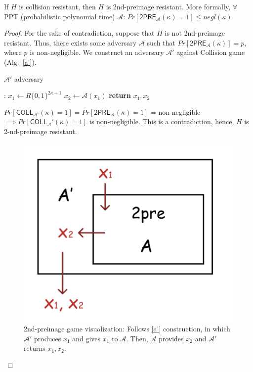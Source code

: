 \begin{theorem}
If $H$ is collision resistant, then $H$ is 2nd-preimage resistant. More formally, $\forall$ PPT (probabilistic polynomial time) $\mathcal{A}$: $Pr[\mathsf{2PRE}_{\mathcal{A}}(\kappa) = 1] \leq
negl(\kappa).$
\end{theorem}

\begin{proof}
For the sake of contradiction, suppose that $H$ is not 2nd-preimage resistant. Thus, there exists some adversary $\mathcal{A}$ such that $Pr[\mathsf{2PRE}_{\mathcal{A}}(\kappa)] = p$, where $p$ is non-negligible. We construct an adversary $\mathcal{A'}$ against Collision game (Alg.~\ref{a'}).

\begin{algorithm}
\caption{$\mathcal{A
}'$ adversary}
\label{a'}
\begin{algorithmic}[1]
:
    \State $x_1 \leftarrow R \{0,1\}^{2\kappa+1}$
    \State $x_2 \leftarrow \mathcal{A}(x_1)$
    \State \textbf{return} $x_1, x_2$
\EndFunction
\end{algorithmic}
\end{algorithm}

$Pr[\mathsf{COLL}_{\mathcal{A}'}(\kappa)=1] = Pr[\mathsf{2PRE}_{\mathcal{A}}(\kappa)=1]$ = non-negligible
$\implies Pr[\mathsf{COLL}_\mathcal{A}'(\kappa)=1]$ is non-negligible.
This is a contradiction, hence, $H$ is 2-nd-preimage resistant.

\begin{figure}[H]
    \centering
    \includegraphics[scale=0.6]{figures/2pre.png}
    \caption{2nd-preimage game visualization: Follows \ref{a'} construction, in which $\mathcal{A}'$ produces $x_1$ and gives $x_1$ to $\mathcal{A}$. Then, $\mathcal{A}$ provides $x_2$ and $\mathcal{A}'$ returns $x_1, x_2$.}
    \label{fig:2pre_viz}
\end{figure}

\end{proof}


